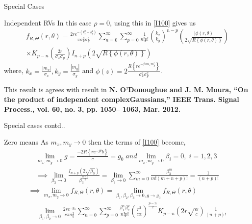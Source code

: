 \documentclass{beamer}
\providecommand{\brak}[1]{\ensuremath{\left(#1\right)}}
\providecommand{\cbrak}[1]{\ensuremath{\left\{#1\right\}}}
\begin{document}
\begin{frame}{Special Cases}
\begin{block}{Independent RVs}
In this case $\rho=0$, using this in \eqref{I100} gives us
\begin{multline}
    f_{R,\Theta}\brak{r,\theta}=\frac{2re^{-\brak{k_x^2+k_y^2}}}{\pi\sigma_x^2\sigma_y^2}\sum\limits_{n=0}^{\infty}\sum\limits_{p=0}^{\infty}\frac{1}{n!p!}\brak{\frac{k_x}{k_y}}^{n-p} \brak{\frac{|\phi(r,\theta)}{2\sqrt{R\cbrak{\phi(r,\theta)}}}}\\\times K_{p-n}\brak{{\frac{2r}{\sigma_x\sigma_y}}}I_{n+p}\brak{2\sqrt{R\cbrak{\phi(r,\theta)}}}
\end{multline}
    where, $ k_x=\frac{|m_x|}{\sigma_x},k_y=\frac{|m_y|}{\sigma_y}$ and 
    $ \phi(z)=2\frac{R\cbrak{re^{-j\theta m_x m_y^*}}}{\sigma_x^2\sigma_y^2}$.
    
    {This result is agrees with result in \textbf{N. O’Donoughue and J. M. Moura, “On the product of independent
complexGaussians,” IEEE Trans. Signal Process., vol. 60, no. 3, pp. 1050–
1063, Mar. 2012.}}
\end{block}
\end{frame}
\begin{frame}{Special cases contd..}
    \begin{block}{Zero means}
    As $m_x,m_y\to0$ then the terms of \eqref{I100} become,
    \begin{align}
        \lim_{m_x,m_y\to0} g=\frac{-2R\cbrak{re^{-j\theta}b}}{c}=g_0\;and\lim_{m_x,m_y\to0} \beta_i=0,\;i=1,2,3\\
       \implies \lim_{\beta_3\to0}\frac{I_{n+p}\brak{2\sqrt{\beta_3}}}{\beta_3^{\frac{n+p}{2}}}=\lim_{\beta_3\to0}\sum\limits_{m=0}^{\infty}\frac{\beta_3^m}{m!(m+n+p)!}=\frac{1}{(n+p)!}
    \end{align}
    \begin{multline}
        \implies \lim_{m_x,m_y\to0}f_{R,\Theta}\brak{r,\theta}=\lim_{\beta_1,\beta_2,\beta_3\to0,g\to g_0}f_{R,\Theta}\brak{r,\theta}\\
        =\lim_{\beta_1,\beta_2\to0}\frac{2re^{-g_0}}{c\pi\sigma_y^2}\sum\limits_{n=0}^{\infty}\sum\limits_{p=0}^{\infty}\frac{\beta_1^n\beta_2^p}{n!p!}\brak{\frac{r^2}{c\alpha}}^\frac{p-n}{2} K_{p-n}\brak{2r\sqrt{\frac{\alpha}{c}}}\frac{1}{(n+p)!}\label{b1}
    \end{multline}
    \end{block}
\end{frame}
\end{document}
